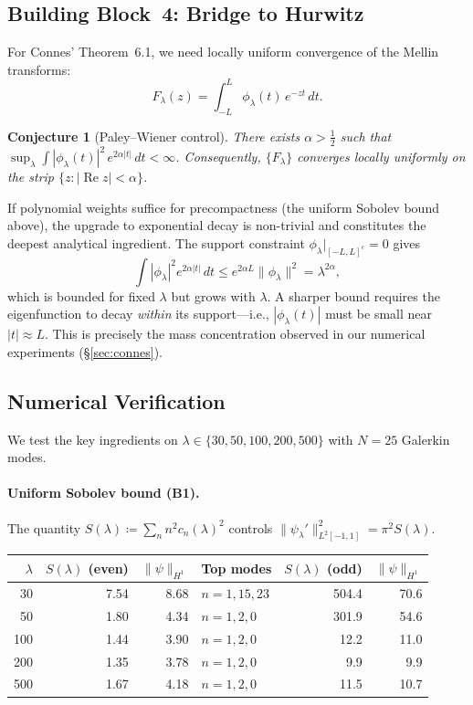 \documentclass[12pt,a4paper]{article}
\newtheorem{conjecture}[theorem]{Conjecture}
\theoremstyle{definition}
\theoremstyle{remark}
\begin{document}
\subsection{Building Block~4: Bridge to Hurwitz}

For Connes' Theorem~6.1, we need locally uniform convergence of the Mellin transforms:
\[
  F_\lambda(z) = \int_{-L}^{L} \phi_\lambda(t)\,e^{-zt}\,dt.
\]

\begin{conjecture}[Paley--Wiener control]
\label{conj:pw}
There exists $\alpha > \tfrac{1}{2}$ such that $\sup_\lambda \int |\phi_\lambda(t)|^2\,e^{2\alpha|t|}\,dt < \infty$. Consequently, $\{F_\lambda\}$ converges locally uniformly on the strip $\{z : |\operatorname{Re} z| < \alpha\}$.
\end{conjecture}

If polynomial weights suffice for precompactness (the uniform Sobolev bound above), the upgrade to exponential decay is non-trivial and constitutes the deepest analytical ingredient. The support constraint $\phi_\lambda|_{[-L,L]^c} = 0$ gives
\[
  \int |\phi_\lambda|^2 e^{2\alpha|t|}\,dt \leq e^{2\alpha L}\|\phi_\lambda\|^2 = \lambda^{2\alpha},
\]
which is bounded for fixed $\lambda$ but grows with $\lambda$. A sharper bound requires the eigenfunction to decay \emph{within} its support---i.e., $|\phi_\lambda(t)|$ must be small near $|t| \approx L$. This is precisely the mass concentration observed in our numerical experiments (\S\ref{sec:connes}).

\subsection{Numerical Verification}
\label{sec:wc-numerics}

We test the key ingredients on $\lambda \in \{30, 50, 100, 200, 500\}$ with $N = 25$ Galerkin modes.

\paragraph{Uniform Sobolev bound (B1).}
The quantity $S(\lambda) \coloneqq \sum_{n} n^2 c_n(\lambda)^2$ controls $\|\psi_\lambda'\|_{L^2[-1,1]}^2 = \pi^2 S(\lambda)$.

\begin{center}
\small
\renewcommand{\arraystretch}{1.15}
\begin{tabular}{r|r|r|l||r|r}
$\lambda$ & $S(\lambda)$ (even) & $\|\psi\|_{H^1}$ & Top modes & $S(\lambda)$ (odd) & $\|\psi\|_{H^1}$ \\\hline
30  & 7.54  & 8.68  & $n = 1,15,23$ & 504.4  & 70.6 \\
50  & 1.80  & 4.34  & $n = 1,2,0$   & 301.9  & 54.6 \\
100 & 1.44  & 3.90  & $n = 1,2,0$   & 12.2   & 11.0 \\
200 & 1.35  & 3.78  & $n = 1,2,0$   & 9.9    & 9.9  \\
500 & 1.67  & 4.18  & $n = 1,2,0$   & 11.5   & 10.7
\end{tabular}
\end{center}
\end{document}
